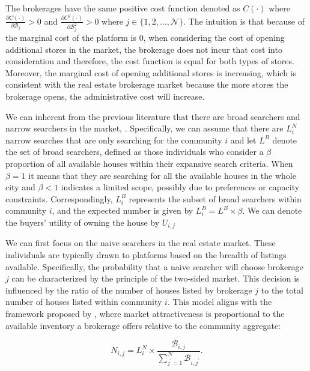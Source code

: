 \documentclass[12pt]{article}
\begin{document}
The brokerages have the same positive cost function denoted as $C(\cdot)$ where $\frac{\partial C(\cdot)}{\partial \mathcal{B}_{j}} > 0$ and $\frac{\partial C^2(\cdot)}{\partial \mathcal{B}_{j}^2} > 0$ where $j \in \{1, 2, \ldots, \mathcal{N}\}$. The intuition is that because of the marginal cost of the platform is $0$, when considering the cost of opening additional stores in the market, the brokerage does not incur that cost into consideration and therefore, the cost function is equal for both types of stores. Moreover, the marginal cost of opening additional stores is increasing, which is consistent with the real estate brokerage market because the more stores the brokerage opens, the administrative cost will increase.

We can inherent from the previous literature that there are broad searchers and narrow searchers in the market, \citep{10.1257/aer.20141772}. Specifically, we can assume that there are $L^N_i$ narrow searches that are only searching for the community $i$ and let $L^B$ denote the set of broad searchers, defined as those individuals who consider a $\beta$ proportion of all available houses within their expansive search criteria. When $\beta = 1$ it means that they are searching for all the available houses in the whole city and $\beta < 1$ indicates a limited scope, possibly due to preferences or capacity constraints. Correspondingly, $L^B_i$ represents the subset of broad searchers within community $i$, and the expected number is given by $L^B_i = L^B \times \beta$. We can denote the buyers' utility of owning the house by $U_{i, j}$ 

We can first focus on the naive searchers in the real estate market. These individuals are typically drawn to platforms based on the breadth of listings available. Specifically, the probability that a naive searcher will choose brokerage $j$ can be characterized by the principle of the two-sided market. This decision is influenced by the ratio of the number of houses listed by brokerage $j$ to the total number of houses listed within community $i$. This model aligns with the framework proposed by \citep{Armstrong2006}, where market attractiveness is proportional to the available inventory a brokerage offers relative to the community aggregate:

\begin{equation}
  N_{i, j} = L^N_i \times \frac{\mathcal{B}_{i, j}}{\sum_{j^\prime=1}^{\mathcal{N}}\mathcal{B}_{i, j^\prime}}. \label{eq:naive_prob}
\end{equation}
\end{document}
